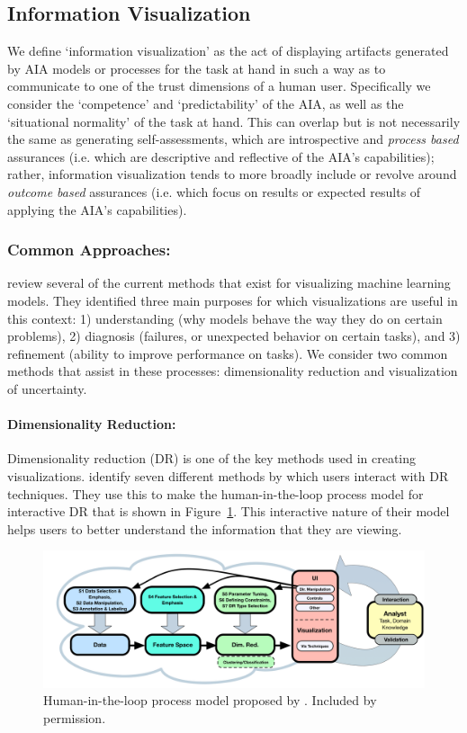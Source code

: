 \subsection{Information Visualization} \label{sec:vis_dr}
We define `information visualization' as the act of displaying artifacts generated by AIA models or processes for the task at hand in such a way as to communicate to one of the trust dimensions of a human user. Specifically we consider the `competence' and `predictability' of the AIA, as well as the `situational normality' of the task at hand. This can overlap but is not necessarily the same as generating self-assessments, which are introspective and \emph{process based} assurances (i.e. which are descriptive and reflective of the AIA's capabilities); rather, information visualization tends to more broadly include or revolve around \emph{outcome based} assurances (i.e. which focus on results or expected results of applying the AIA's capabilities).  

\subsubsection{Common Approaches:}
\citet{Liu2017-xw} review several of the current methods that exist for visualizing machine learning models. They identified three main purposes for which visualizations are useful in this context: 1) understanding (why models behave the way they do on certain problems), 2) diagnosis (failures, or unexpected behavior on certain tasks), and 3) refinement (ability to improve performance on tasks). 
We consider two common methods that assist in these processes: dimensionality reduction and visualization of uncertainty.

\paragraph{Dimensionality Reduction:}
Dimensionality reduction (DR) is one of the key methods used in creating visualizations. \citet{Sacha2017-hf} identify seven different methods by which users interact with DR techniques. They use this to make the human-in-the-loop process model for interactive DR that is shown in Figure~\ref{fig:sacha_fig}. This interactive nature of their model helps users to better understand the information that they are viewing.

\begin{figure}[htpb]
    \centering
    \includegraphics[width=0.8\linewidth]{Figures/dimred_framework.png}
    \caption{Human-in-the-loop process model proposed by \cite{Sacha2017-hf}. Included by permission.}
    \label{fig:sacha_fig}
\end{figure}

